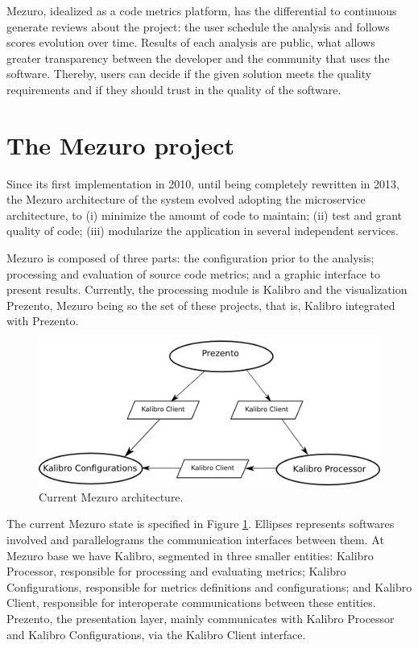 \documentclass{llncs}
\begin{document}
Mezuro, idealized as a code metrics platform, has the differential to
continuous generate reviews about the project: the user schedule the analysis %
and follows scores evolution over time. Results of each analysis are public, %
what allows greater transparency between the developer and the community that
uses the software. Thereby, users can decide if the given solution meets the
quality requirements and if they should trust in the quality of the software.

\section{The Mezuro project}
\label{sec:mezuro}

Since its first implementation in 2010\cite{mezuro2012}, until being completely
rewritten in 2013, the Mezuro architecture of the system evolved adopting the
microservice architecture\cite{namiot2014micro}, to (i) minimize the amount of
code to maintain; (ii) test and grant quality of code; (iii) modularize the
application in several independent services.

Mezuro is composed of three parts: the configuration prior to the analysis;
processing and evaluation of source code metrics; and a graphic
interface to present results. Currently, the processing module is Kalibro and
the visualization Prezento, Mezuro being so the set of these projects, that is,
Kalibro integrated with Prezento.

\begin{figure}[hbt]
  \centering
    \includegraphics[width=.8\linewidth]{images/mezuro-architecturev3.png}
  \caption{Current Mezuro architecture.}
  \label{fig:architecture-2}
\end{figure}

The current Mezuro state is specified in Figure \ref{fig:architecture-2}.
Ellipses represents softwares involved and parallelograms the communication
interfaces between them. At Mezuro base we have Kalibro, segmented in three
smaller entities: Kalibro Processor, responsible for processing and evaluating
metrics; Kalibro Configurations, responsible for metrics definitions and
configurations; and Kalibro Client, responsible for interoperate communications
between these entities.  Prezento, the presentation layer, mainly communicates
with Kalibro Processor and Kalibro Configurations, via the Kalibro Client
interface.
\end{document}
